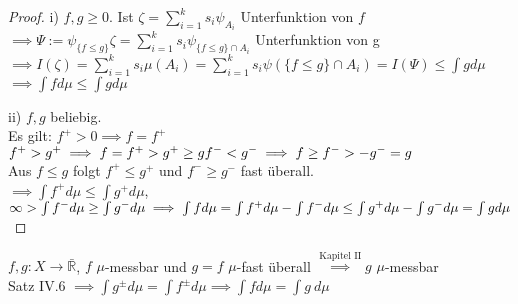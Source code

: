   \begin{proof}
    \item[i)] $f,g \geq 0$. Ist $\zeta = \sum\limits_{i=1}^k s_i \psi_{A_i}$ Unterfunktion von $f$ $\implies \Psi := \psi_{\{f \leq g \}}\zeta = \sum\limits_{i=1}^k s_i \psi_{\{f\leq g\}\cap A_i}$ Unterfunktion von g \\
    $\implies I(\zeta) = \sum\limits_{i=1}^k s_i \mu (A_i) = \sum\limits_{i=1}^k s_i \psi(\{f \leq g\}\cap A_i) = I(\Psi) \leq \int g d\mu$ \\
    $\implies\int f d\mu \leq \int g d\mu$ 
    \item[ii)] $f,g$ beliebig. \\
    Es gilt: $f^+ > 0 \implies f= f^+$ \\
    $f^+ > g^+ \implies f = f^+ > g^+ \geq g \\
    f^- < g^- \implies f \geq f^- > -g^- = g$ \\
    Aus $f \leq g$ folgt $f^+ \leq g^+$ und $f^- \geq g^-$ fast überall. \\
    $\implies \int f^+ d\mu \leq \int g^+ d\mu$, $\infty > \int f^- d\mu \geq \int g^- d\mu \\ 
    \implies \int f d\mu = \int f^+ d\mu - \int f^- d\mu \leq \int g^+ d\mu - \int g^- d\mu = \int g d\mu$
    
  \end{proof}

  \begin{remark}
    $f,g: X \to \bar{\mathbb{R}}$, $f$ $\mu$-messbar und $g = f$ $\mu$-fast überall $\stackrel{\text{Kapitel II}}{\implies} g$ $\mu$-messbar\\
    Satz IV.6 $\implies \int g^{\pm} d\mu = \int f^{\pm} d\mu \implies \int f d\mu = \int g \ d\mu$
  \end{remark}


